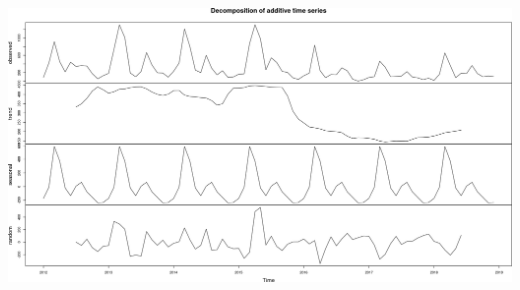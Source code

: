 \documentclass[10pt,landscape,a3paper]{article}
\newenvironment{Shaded}{\begin{snugshade}}{\end{snugshade}}
\begin{document}
\begin{center}\includegraphics[width=0.75\linewidth]{img/data-download-preparation-eda/unnamed-chunk-1-4} \end{center}

\begin{Shaded}
\begin{Highlighting}[]


\end{Highlighting}
\end{Shaded}
\end{document}
